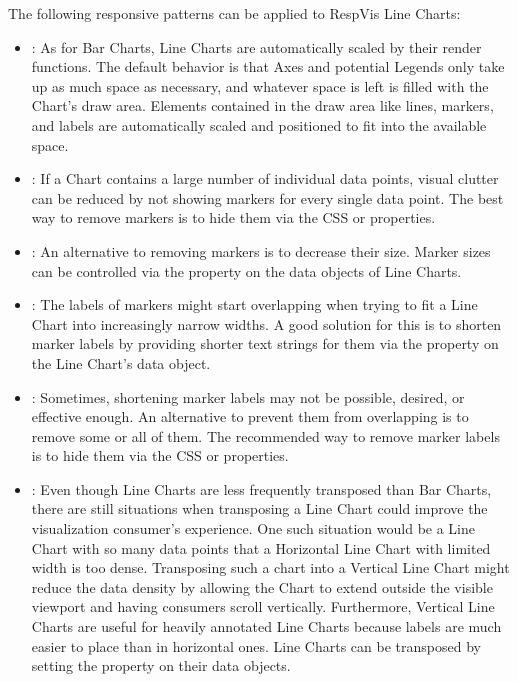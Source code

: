 The following responsive patterns can be applied to RespVis Line Charts:
\begin{itemize}
\item {}: As for Bar Charts, Line Charts are
  automatically scaled by their render functions. The default behavior
  is that Axes and potential Legends only take up as much space as
  necessary, and whatever space is left is filled with the Chart's
  draw area. Elements contained in the draw area like lines,
  markers, and labels are automatically scaled and positioned to fit
  into the available space.

\item {}: If a Chart contains a large number of
  individual data points, visual clutter can be reduced by not showing
  markers for every single data point. The best way to remove markers
  is to hide them via the CSS  or 
  properties.

\item {}: An alternative to removing markers is
  to decrease their size. Marker sizes can be controlled via the
   property on the data objects of Line Charts.

\item {}: The labels of markers might
  start overlapping when trying to fit a Line Chart into increasingly
  narrow widths. A good solution for this is to shorten marker labels
  by providing shorter text strings for them via the 
  property on the Line Chart's data object.

\item {}: Sometimes, shortening marker
  labels may not be possible, desired, or effective enough. An
  alternative to prevent them from overlapping is to remove some or
  all of them. The recommended way to remove marker labels is to hide
  them via the CSS  or  properties.

\item {}: Even though Line Charts are less
  frequently transposed than Bar Charts, there are still situations
  when transposing a Line Chart could improve the visualization
  consumer's experience. One such situation would be a Line Chart with
  so many data points that a Horizontal Line Chart with limited width
  is too dense. Transposing such a chart into a Vertical Line Chart
  might reduce the data density by allowing the Chart to extend
  outside the visible viewport and having consumers scroll vertically.
  Furthermore, Vertical Line Charts are useful for heavily annotated
  Line Charts because labels are much easier to place than in
  horizontal ones. Line Charts can be transposed by setting the
   property on their data objects.


\end{itemize}
